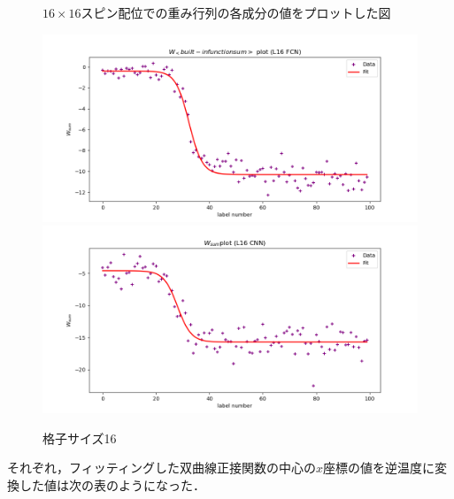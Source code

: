 \documentclass[a4paper,11pt]{jsreport}
\begin{document}
\begin{figure}[H]
\begin{minipage}[b]{0.45\linewidth}
\begin{center}
    \end{center}
  \end{minipage}
  \caption{$16 \times 16$スピン配位での重み行列の各成分の値をプロットした図}
  \label{温度測定器ヒートマップ16}
\end{figure}

\begin{figure}[H]
  \begin{center}
    \includegraphics[width=\linewidth]{image/L16_FCNN_weight_sum.png}
    \includegraphics[width=\linewidth]{image/L16_CNN_weight_sum.png}
  \end{center}
  \caption{格子サイズ16}
  \label{温度測定器プロット16}
\end{figure}

それぞれ，フィッティングした双曲線正接関数の中心の$x$座標の値を逆温度に変換した値は次の表のようになった．

\end{document}
